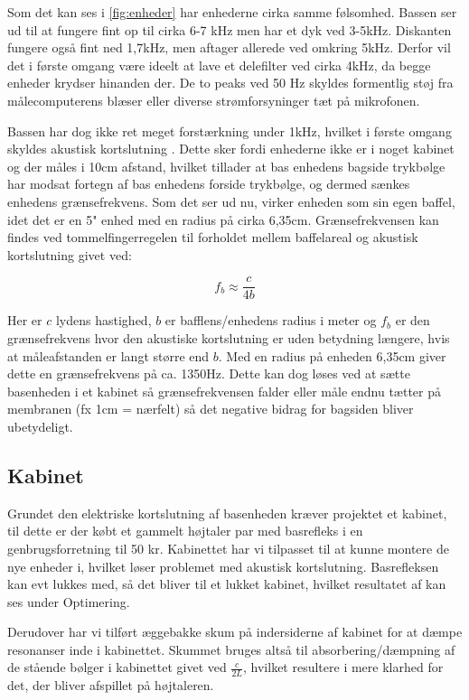 Som det kan ses i \autoref{fig:enheder} har enhederne cirka samme følsomhed. Bassen ser ud til at fungere fint op til cirka 6-7 kHz men har et dyk ved 3-5kHz. Diskanten fungere også fint ned 1,7kHz, men aftager allerede ved omkring 5kHz. Derfor vil det i første omgang være ideelt at lave et delefilter ved cirka 4kHz, da begge enheder krydser hinanden der. De to peaks ved 50 Hz skyldes formentlig støj fra målecomputerens blæser eller diverse strømforsyninger tæt på mikrofonen.

Bassen har dog ikke ret meget forstærkning under 1kHz, hvilket i første omgang skyldes akustisk kortslutning \cite[side 24]{Elektroakustik}. Dette sker fordi enhederne ikke er i noget kabinet og der måles i 10cm afstand, hvilket tillader at bas enhedens bagside trykbølge har modsat fortegn af bas enhedens forside trykbølge, og dermed sænkes enhedens grænsefrekvens. Som det ser ud nu, virker enheden som sin egen baffel, idet det er en 5" enhed med en radius på cirka 6,35cm. Grænsefrekvensen kan findes ved tommelfingerregelen til forholdet mellem baffelareal og akustisk kortslutning givet ved: \cite[side 44]{Elektroakustik}

\begin{equation}
f_b \approx \frac{c} {4 b} 
\end{equation}

Her er $c$ lydens hastighed, $b$ er bafflens/enhedens radius i meter og $f_b$ er den grænsefrekvens hvor den akustiske kortslutning er uden betydning længere, hvis at måleafstanden er langt større end $b$. Med en radius på enheden 6,35cm giver dette en grænsefrekvens på ca. 1350Hz. Dette kan dog løses ved at sætte basenheden i et kabinet så grænsefrekvensen falder eller måle endnu tætter på membranen (fx 1cm = nærfelt) så det negative bidrag for bagsiden bliver ubetydeligt. 

\subsection{Kabinet}
Grundet den elektriske kortslutning af basenheden kræver projektet et kabinet, til dette er der købt et gammelt højtaler par med basrefleks i en genbrugsforretning til 50 kr. Kabinettet har vi tilpasset til at kunne montere de nye enheder i, hvilket løser problemet med akustisk kortslutning. Basrefleksen kan evt lukkes med, så det bliver til et lukket kabinet, hvilket resultatet af kan ses under Optimering.

Derudover har vi tilført æggebakke skum på indersiderne af kabinet for at dæmpe resonanser inde i kabinettet. Skummet bruges altså til absorbering/dæmpning af de stående bølger i kabinettet givet ved $ \frac{c}{2L} $, hvilket resultere i mere klarhed for det, der bliver afspillet på højtaleren.

